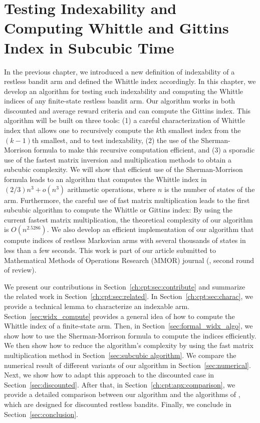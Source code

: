 \begingroup

\let\clearpage\relax

\chapter{Testing Indexability and Computing Whittle and Gittins Index in Subcubic Time}
\label{ch:index_computation}

In the previous chapter, we introduced a new definition of indexability of a restless bandit arm and defined the Whittle index accordingly.
In this chapter, we develop an algorithm for testing such indexability and computing the Whittle indices of any finite-state restless bandit arm.
Our algorithm works in both discounted and average reward criteria and can compute the Gittins index.
This algorithm will be built on three tools: (1) a careful characterization of Whittle index that allows one to recursively compute the $k$th smallest index from the $(k-1)$th smallest, and to test indexability, (2) the use of the Sherman-Morrison formula to make this recursive computation efficient, and (3) a sporadic use of the fastest matrix inversion and multiplication methods to obtain a subcubic complexity.
We will show that efficient use of the Sherman-Morrison formula leads to an algorithm that computes the Whittle index in $(2/3)n^3 + o(n^3)$ arithmetic operations, where $n$ is the number of states of the arm. 
Furthermore, the careful use of fast matrix multiplication leads to the first subcubic algorithm to compute the Whittle or Gittins index: By using the current fastest matrix multiplication, the theoretical complexity of our algorithm is $O(n^{2.5286})$.
We also develop an efficient implementation of our algorithm that compute indices of restless Markovian arms with several thousands of states in less than a few seconds.
This work is part of our article submitted to Mathematical Methods of Operations Research (MMOR) journal (\cite{gast2022computing}, second round of review).

We present our contributions in Section~\ref{ch:cpt:sec:contribute} and summarize the related work in Section~\ref{ch:cpt:sec:related}.
In Section~\ref{ch:cpt:sec:charac}, we provide a technical lemma to characterize an indexable arm.
Section~\ref{sec:widx_compute} provides a general idea of how to compute the Whittle index of a finite-state arm.
Then, in Section~\ref{sec:formal_widx_algo}, we show how to use the Sherman-Morrison formula to compute the indices efficiently. We then show how to reduce the algorithm's complexity by using the fast matrix multiplication method in Section~\ref{sec:subcubic algorithm}. We compare the numerical result of different variants of our algorithm in Section~\ref{sec:numerical}. Next, we show how to adapt this approach to the discounted case in Section~\ref{sec:discounted}.
After that, in Section~\ref{ch:cpt:apx:comparison}, we provide a detailed comparison between our algorithm and the algorithms of \cite{nino2020fast, akbarzadeh2020conditions}, which are designed for discounted restless bandits.
Finally, we conclude in Section~\ref{sec:conclusion}.

